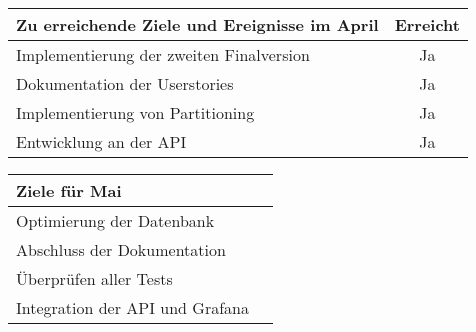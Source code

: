\begin{tabularx}{\textwidth}{Xc}
    \arrayrulecolor{OliveGreen}
    \toprule
    {\bfseries Zu erreichende Ziele und Ereignisse im April} & {\bfseries Erreicht} \\
    \midrule[2pt]
    Implementierung der zweiten Finalversion      &Ja                    \\
    \rowcolor{OliveGreen!15}
    Dokumentation der Userstories                             &Ja                    \\
    \rowcolor{White}
    Implementierung von Partitioning      &Ja                    \\
    \rowcolor{OliveGreen!15}
    Entwicklung an der API                             &Ja                    \\
    \bottomrule[2pt]
\end{tabularx}
%
\vspace{1cm}
%
\begin{tabularx}{\textwidth}{Xc}
    \arrayrulecolor{OliveGreen}
    \toprule
    {\bfseries Ziele für Mai}                         &                      \\
    \midrule[2pt]
    Optimierung der Datenbank &                      \\
    \rowcolor{OliveGreen!15}
    Abschluss der Dokumentation  &                      \\
    \rowcolor{White}
    Überprüfen aller Tests                     &                      \\
    \rowcolor{OliveGreen!15}
    Integration der API und Grafana             &                      \\
\end{tabularx}
